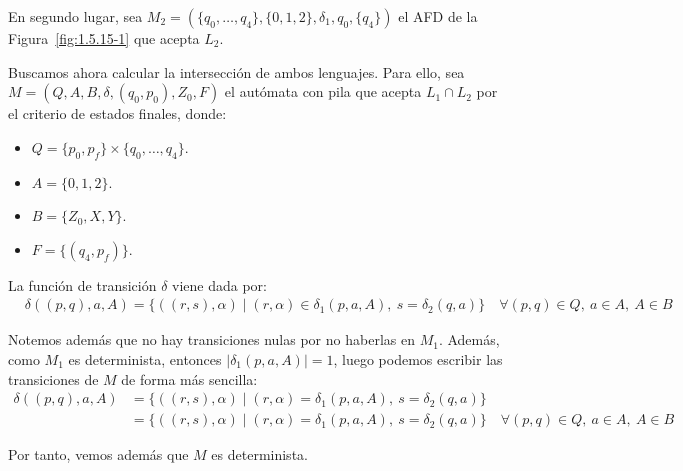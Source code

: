 \begin{ejercicio}
\begin{description}
        En segundo lugar, sea $M_2=(\{q_0,\ldots,q_4\},\{0,1,2\},\delta_1,q_0,\{q_4\})$ el AFD de la Figura~\ref{fig:1.5.15-1} que acepta $L_2$.

        Buscamos ahora calcular la intersección de ambos lenguajes. Para ello, sea $M=(Q,A,B,\delta,(q_0,p_0),Z_0,F)$ el autómata con pila que acepta $L_1\cap L_2$ por el criterio de estados finales, donde:
        \begin{itemize}
            \item $Q=\{p_0,p_f\}\times \{q_0,\ldots,q_4\}$.
            \item $A=\{0,1,2\}$.
            \item $B=\{Z_0,X,Y\}$.
            \item $F=\{(q_4,p_f)\}$.
        \end{itemize}
        La función de transición $\delta$ viene dada por:
        \begin{align*}
            &\delta((p,q),a,A) = \{((r,s),\alpha)\mid (r,\alpha)\in \delta_1(p,a,A),\ s=\delta_2(q,a)\} \quad \forall (p,q)\in Q,\ a\in A,\ A\in B
        \end{align*}

        Notemos además que no hay transiciones nulas por no haberlas en $M_1$. Además, como $M_1$ es determinista, entonces $|\delta_1(p,a,A)|=1$, luego podemos escribir las transiciones de $M$ de forma más sencilla:
        \begin{align*}
            \delta((p,q),a,A) &= \{((r,s),\alpha)\mid (r,\alpha)=\delta_1(p,a,A),\ s=\delta_2(q,a)\} \\
            &= \{((r,s),\alpha)\mid (r,\alpha)=\delta_1(p,a,A),\ s=\delta_2(q,a)\} \quad \forall (p,q)\in Q,\ a\in A,\ A\in B
        \end{align*}

        Por tanto, vemos además que $M$ es determinista.
    \end{description}

\end{ejercicio}

